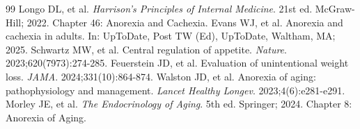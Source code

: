 \begin{thebibliography}{99}
 Longo DL, et al. \emph{Harrison's Principles of Internal Medicine}. 21st ed. McGraw-Hill; 2022. Chapter 46: Anorexia and Cachexia.
 Evans WJ, et al. Anorexia and cachexia in adults. In: UpToDate, Post TW (Ed), UpToDate, Waltham, MA; 2025.
 Schwartz MW, et al. Central regulation of appetite. \emph{Nature}. 2023;620(7973):274-285.
 Feuerstein JD, et al. Evaluation of unintentional weight loss. \emph{JAMA}. 2024;331(10):864-874.
 Walston JD, et al. Anorexia of aging: pathophysiology and management. \emph{Lancet Healthy Longev}. 2023;4(6):e281-e291.
 Morley JE, et al. \emph{The Endocrinology of Aging}. 5th ed. Springer; 2024. Chapter 8: Anorexia of Aging.
\end{thebibliography}
